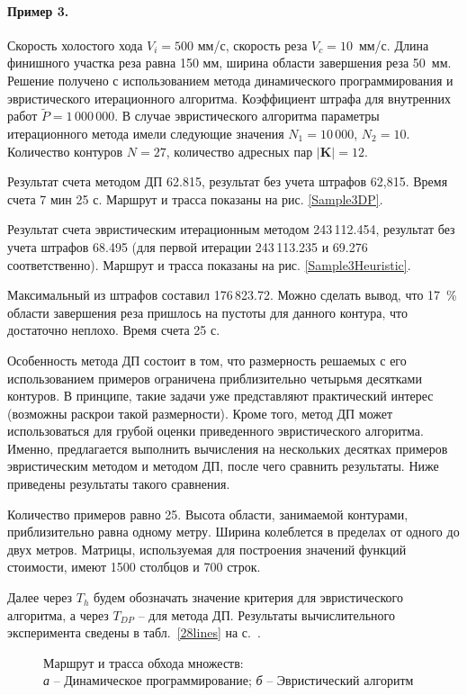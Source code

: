 \paragraph*{Пример 3.}

Скорость холостого хода $V_i=500$ мм/с,
скорость реза $V_c=10$~мм/с.
Длина финишного участка реза равна 150 мм,
ширина области завершения реза 50~мм.
Решение получено с использованием метода динамического программирования
и эвристического итерационного алгоритма.
Коэффициент штрафа для внутренних работ
$\tilde{P}=1\,000\,000$.
В случае эвристического алгоритма параметры итерационного
метода имели следующие значения
$N_1=10\,000$,
$N_2=10$.
Количество контуров $N=27$,
количество адресных пар $|\mathbf{K}|=12$.

Результат счета методом ДП 62.815,
результат без учета штрафов 62,815.
Время счета 7 мин 25 с.
Маршрут и трасса показаны на рис. \ref{Sample3DP}.

Результат счета эвристическим итерационным методом 243\,112.454,
результат без учета штрафов 68.495
(для первой итерации 243\,113.235 и 69.276
соответственно).
Маршрут и трасса показаны на рис. \ref{Sample3Heuristic}.

Максимальный из штрафов составил 176\,823.72.
Можно сделать вывод, что 17~\% области завершения реза пришлось на пустоты для
данного контура, что достаточно неплохо.
Время счета 25 с.

Особенность метода ДП состоит в том,
что размерность решаемых с его использованием примеров
ограничена приблизительно четырьмя десятками контуров.
В принципе, такие задачи уже представляют практический интерес
(возможны раскрои такой размерности).
Кроме того, метод ДП может использоваться для грубой оценки
приведенного эвристического алгоритма.
Именно, предлагается выполнить вычисления на нескольких десятках
примеров эвристическим методом и методом ДП,
после чего сравнить результаты.
Ниже приведены результаты такого сравнения.

Количество примеров равно 25.
Высота области, занимаемой контурами,
приблизительно равна одному метру.
Ширина колеблется в пределах от одного до двух метров.
Матрицы, используемая для построения значений функций стоимости,
имеют 1500 столбцов и 700 строк.

Далее через
$T_h$ будем обозначать значение критерия для эвристического алгоритма,
а через $T_{DP}$ -- для метода ДП.
Результаты вычислительного эксперимента
сведены в табл.~\ref{28lines}
на с.~\pageref{28lines}.

\begin{figure}[p]
  \centering
  \caption{
    Маршрут и трасса обхода множеств:\\
    {\it а} -- Динамическое программирование;
    {\it б} -- Эвристический алгоритм
    }
\end{figure}

